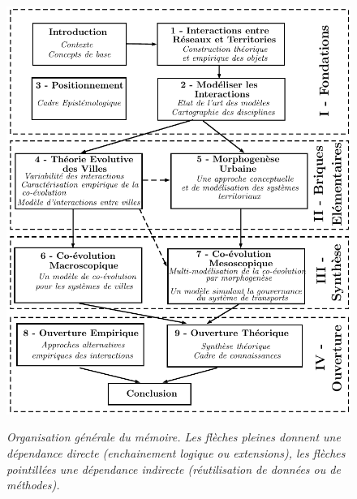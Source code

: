 \begin{figure}[h!]
	\begin{mdframed}
		
		\includegraphics[width=\linewidth]{Figures/Theory/plan.pdf}
		
		\medskip
		
		 \textit{Organisation générale du mémoire. Les flèches pleines donnent une dépendance directe (enchainement logique ou extensions), les flèches pointillées une dépendance indirecte (réutilisation de données ou de méthodes).}
		
	\end{mdframed}
\end{figure}







